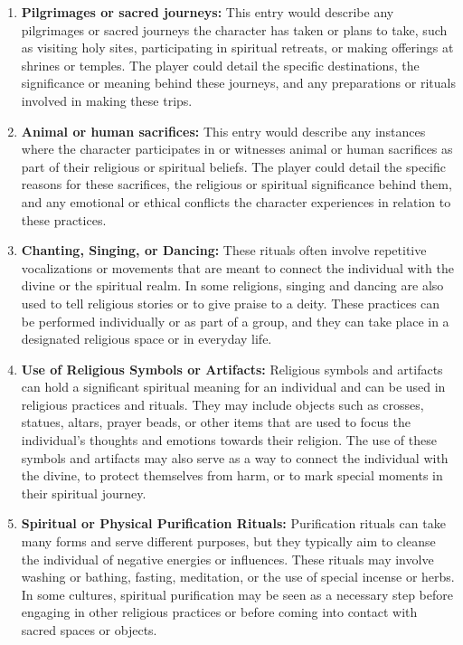 \begin{enumerate}
    \item \textbf{Pilgrimages or sacred journeys:}
    This entry would describe any pilgrimages or sacred journeys the character has taken or plans to take, such as visiting holy sites, participating in spiritual retreats, or making offerings at shrines or temples. The player could detail the specific destinations, the significance or meaning behind these journeys, and any preparations or rituals involved in making these trips.

    \item \textbf{Animal or human sacrifices:}
    This entry would describe any instances where the character participates in or witnesses animal or human sacrifices as part of their religious or spiritual beliefs. The player could detail the specific reasons for these sacrifices, the religious or spiritual significance behind them, and any emotional or ethical conflicts the character experiences in relation to these practices.

    \item \textbf{Chanting, Singing, or Dancing:}
    These rituals often involve repetitive vocalizations or movements that are meant to connect the individual with the divine or the spiritual realm. In some religions, singing and dancing are also used to tell religious stories or to give praise to a deity. These practices can be performed individually or as part of a group, and they can take place in a designated religious space or in everyday life.

    \item \textbf{Use of Religious Symbols or Artifacts:}
    Religious symbols and artifacts can hold a significant spiritual meaning for an individual and can be used in religious practices and rituals. They may include objects such as crosses, statues, altars, prayer beads, or other items that are used to focus the individual's thoughts and emotions towards their religion. The use of these symbols and artifacts may also serve as a way to connect the individual with the divine, to protect themselves from harm, or to mark special moments in their spiritual journey.
    
    \item \textbf{Spiritual or Physical Purification Rituals:}
    Purification rituals can take many forms and serve different purposes, but they typically aim to cleanse the individual of negative energies or influences. These rituals may involve washing or bathing, fasting, meditation, or the use of special incense or herbs. In some cultures, spiritual purification may be seen as a necessary step before engaging in other religious practices or before coming into contact with sacred spaces or objects.
    

\end{enumerate}
